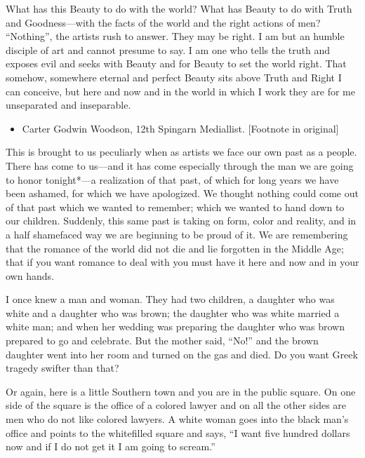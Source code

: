 \documentclass[letterpaper,10pt,english]{jupyterBook}
\begin{document}
\sphinxAtStartPar
What has this Beauty to do with the world? What has Beauty to do with Truth and Goodness—with the facts of the world and the right actions of men? “Nothing”, the artists rush to answer. They may be right. I am but an humble disciple of art and cannot presume to say. I am one who tells the truth and exposes evil and seeks with Beauty and for Beauty to set the world right. That somehow, somewhere eternal and perfect Beauty sits above Truth and Right I can conceive, but here and now and in the world in which I work they are for me unseparated and inseparable.

\begin{sphinxShadowBox}
\sphinxstylesidebartitle{}
\begin{itemize}
\item {} 
\sphinxAtStartPar
Carter Godwin Woodson, 12th Spingarn Mediallist. {[}Footnote in original{]}

\end{itemize}
\end{sphinxShadowBox}

\sphinxAtStartPar
This is brought to us peculiarly when as artists we face our own past as a people. There has come to us—and it has come especially through the man we are going to honor tonight*—a realization of that past, of which for long years we have been ashamed, for which we have apologized. We thought nothing could come out of that past which we wanted to remember; which we wanted to hand down to our children. Suddenly, this same past is taking on form, color and reality, and in a half shamefaced way we are beginning to be proud of it. We are remembering that the romance of the world did not die and lie forgotten in the Middle Age; that if you want romance to deal with you must have it here and now and in your own hands.

\sphinxAtStartPar
I once knew a man and woman. They had two children, a daughter who was white and a daughter who was brown; the daughter who was white married a white man; and when her wedding was preparing the daughter who was brown prepared to go and celebrate. But the mother said, “No!” and the brown daughter went into her room and turned on the gas and died. Do you want Greek tragedy swifter than that?

\sphinxAtStartPar
Or again, here is a little Southern town and you are in the public square. On one side of the square is the office of a colored lawyer and on all the other sides are men who do not like colored lawyers. A white woman goes into the black man’s office and points to the white\sphinxhyphen{}filled square and says, “I want five hundred dollars now and if I do not get it I am going to scream.”
\end{document}
